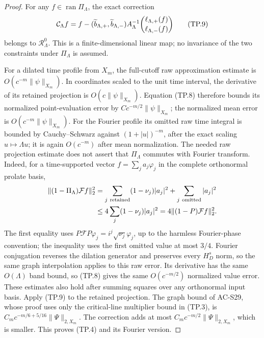 \begin{proof}
For any \(f\in\operatorname{ran}\Pi_\Lambda\), the exact
correction
\[
 {\cal C}_\Lambda f
   =f-(\widetilde b_{\Lambda,+},\widetilde b_{\Lambda,-})
                 A_\Lambda^{-1}
             \binom{\ell_{\Lambda,+}(f)}
                   {\ell_{\Lambda,-}(f)}
 \tag{TP.9}
\]
belongs to \(\mathcal R_\Lambda^0\).
This is a finite-dimensional linear map; no invariance
of the two constraints under \(\Pi_\Lambda\) is assumed.

For a dilated time profile from \(X_m\), the full-cutoff
raw approximation estimate is
\(O(c^{-m}\|\psi\|_{X_m})\).
In coordinates scaled to the unit time interval, the
derivative of its retained projection is
\(O(c\|\psi\|_{X_m})\).
Equation (TP.8) therefore bounds its normalized
point-evaluation error by
\(C c^{-m/2}\|\psi\|_{X_m}\); the normalized mean
error is \(O(c^{-m}\|\psi\|_{X_m})\).
For the Fourier profile its omitted raw time integral
is bounded by Cauchy--Schwarz against
\((1+|u|)^{-m}\), after the exact scaling
\(u\mapsto\Lambda u\); it is again \(O(c^{-m})\)
after mean normalization.  The needed raw projection
estimate does not assert that \(\Pi_\Lambda\) commutes
with Fourier transform.  Indeed, for a time-supported
vector \(f=\sum_j a_j\varphi_j\) in the complete
orthonormal prolate basis,
\[
 \begin{split}
 \|(1-\Pi_\Lambda)\mathcal Ff\|_2^2
   &=\sum_{j\ {\rm retained}}(1-\nu_j)|a_j|^2
                        +\sum_{j\ {\rm omitted}}|a_j|^2\\
   &\leq4\sum_j(1-\nu_j)|a_j|^2
                    =4\|(1-P)\mathcal Ff\|_2^2 .
 \end{split}
\]
The first equality uses
\(P\mathcal F P\varphi_j=i^j\sqrt{\nu_j}\varphi_j\),
up to the harmless Fourier-phase convention; the
inequality uses the first omitted value at most
\(3/4\).
Fourier conjugation reverses the dilation generator
and preserves every \(H_D^s\) norm, so the same
graph interpolation applies to this raw error.
Its derivative has the
same \(O(\Lambda)\) band bound, so (TP.8) gives the
same \(O(c^{-m/2})\) normalized value error.
These estimates also hold after summing squares
over any orthonormal input basis.
Apply (TP.9) to the retained projection.
The graph bound of AC-S29, whose proof uses only the
critical-line multiplier bound in (TP.3), is
\(C_m c^{-m/6+5/16}\|\Psi\|_{2,X_m}\).
The correction adds at most
\(C_m c^{-m/2}\|\Psi\|_{2,X_m}\), which is smaller.
This proves (TP.4) and its Fourier version.


\end{proof}
